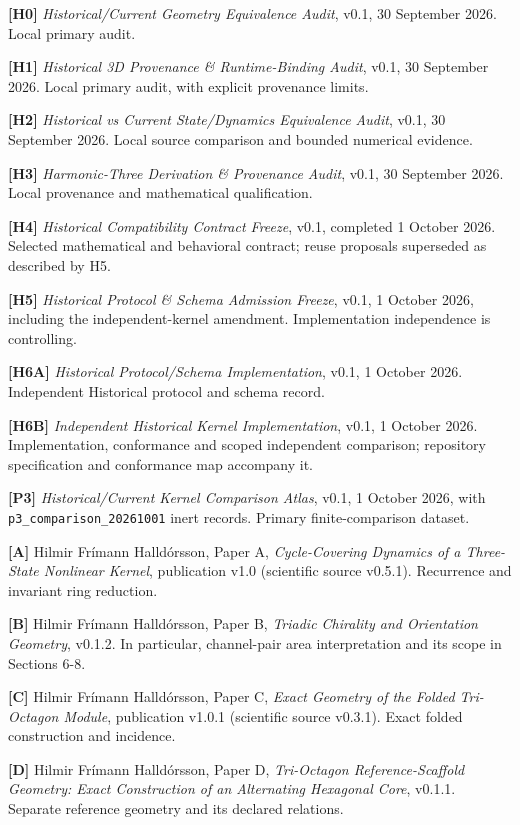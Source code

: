 \documentclass[
  11pt,
  a4paper,
]{article}
\begin{document}
\textbf{{[}H0{]}} \emph{Historical/Current Geometry Equivalence Audit}, v0.1, 30 September 2026. Local primary audit.

\textbf{{[}H1{]}} \emph{Historical 3D Provenance \& Runtime-Binding Audit}, v0.1, 30 September 2026. Local primary audit, with explicit provenance limits.

\textbf{{[}H2{]}} \emph{Historical vs Current State/Dynamics Equivalence Audit}, v0.1, 30 September 2026. Local source comparison and bounded numerical evidence.

\textbf{{[}H3{]}} \emph{Harmonic-Three Derivation \& Provenance Audit}, v0.1, 30 September 2026. Local provenance and mathematical qualification.

\textbf{{[}H4{]}} \emph{Historical Compatibility Contract Freeze}, v0.1, completed 1 October 2026. Selected mathematical and behavioral contract; reuse proposals superseded as described by H5.

\textbf{{[}H5{]}} \emph{Historical Protocol \& Schema Admission Freeze}, v0.1, 1 October 2026, including the independent-kernel amendment. Implementation independence is controlling.

\textbf{{[}H6A{]}} \emph{Historical Protocol/Schema Implementation}, v0.1, 1 October 2026. Independent Historical protocol and schema record.

\textbf{{[}H6B{]}} \emph{Independent Historical Kernel Implementation}, v0.1, 1 October 2026. Implementation, conformance and scoped independent comparison; repository specification and conformance map accompany it.

\textbf{{[}P3{]}} \emph{Historical/Current Kernel Comparison Atlas}, v0.1, 1 October 2026, with \nolinkurl{p3_comparison_20261001} inert records. Primary finite-comparison dataset.

\textbf{{[}A{]}} Hilmir Frímann Halldórsson, Paper A, \emph{Cycle-Covering Dynamics of a Three-State Nonlinear Kernel}, publication v1.0 (scientific source v0.5.1). Recurrence and invariant ring reduction.

\textbf{{[}B{]}} Hilmir Frímann Halldórsson, Paper B, \emph{Triadic Chirality and Orientation Geometry}, v0.1.2. In particular, channel-pair area interpretation and its scope in Sections 6-8.

\textbf{{[}C{]}} Hilmir Frímann Halldórsson, Paper C, \emph{Exact Geometry of the Folded Tri-Octagon Module}, publication v1.0.1 (scientific source v0.3.1). Exact folded construction and incidence.

\textbf{{[}D{]}} Hilmir Frímann Halldórsson, Paper D, \emph{Tri-Octagon Reference-Scaffold Geometry: Exact Construction of an Alternating Hexagonal Core}, v0.1.1. Separate reference geometry and its declared relations.
\end{document}
